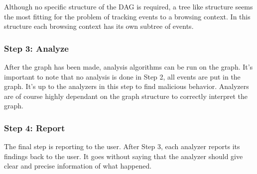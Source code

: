 Although no specific structure of the DAG is required, a tree like structure seems the most fitting for the problem of tracking events to a browsing context. In this structure each browsing context has its own subtree of events. 



\subsubsection{Step 3: Analyze}

After the graph has been made, analysis algorithms can be run on the graph. It's important to note that no analysis is done in Step 2, all events are put in the graph. It's up to the analyzers in this step to find malicious behavior. Analyzers are of course highly dependant on the graph structure to correctly interpret the graph.\\


\subsubsection{Step 4: Report}

The final step is reporting to the user. After Step 3, each analyzer reports its findings back to the user. It goes without saying that the analyzer should give clear and precise information of what happened.
